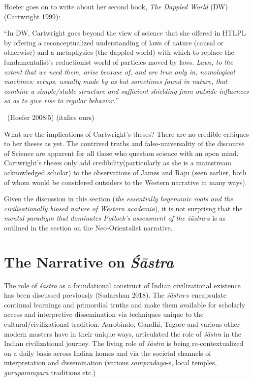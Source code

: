 \vskip 2pt

Hoefer goes on to write about her second book, \textit{The Dappled World} (DW)(Cartwright 1999):

\vskip 2pt

\begin{myquote}
“In DW, Cartwright goes beyond the view of science that she offered in HTLPL by offering a reconceptualized understanding of laws of nature (causal or otherwise) and a metaphysics (the dappled world) with which to replace the fundamentalist’s reductionist world of particles moved by laws. \textit{Laws, to the extent that we need them, arise because of, and are true only in, nomological machines: setups, usually made by us but sometimes found in nature, that combine a simple/stable structure and sufficient shielding from outside influences so as to give rise to regular behavior.”} 

~\hfill (Hoefer 2008:5) (italics ours)
\end{myquote}

What are the implications of Cartwright’s theses? There are no credible critiques to her theses as yet. The contrived truths and false-universality of the discourse of Science are apparent for all those who question science with an open mind. Cartwright’s theses only add credibility(particularly as she is a mainstream acknowledged scholar) to the observations of James and Raju (seen earlier, both of whom would be considered outsiders to the Western narrative in many ways).

Given the discussion in this section (\textit{the essentially hegemonic roots and the civilisationally biased nature of Western academia}), it is not surprisng that the \textit{mental paradigm that dominates Pollock’s assessment of the śāstra}-s is as outlined in the section on the Neo-Orientalist narrative.


\section*{The Narrative on \textit{Śāstra}}

The role of \textit{śāstra} as a foundational construct of Indian civilizational existence has been discussed previously (Sudarshan 2018). The \textit{śāstra}-s encapsulate continual learnings and primordial truths and make them available for scholarly access and interpretive dissemination via techniques unique to the cultural/civilizational tradition. Aurobindo, Gandhi, Tagore and various other modern masters have in their unique ways, articulated the role of \textit{śāstra} in the Indian civilizational journey. The living role of \textit{śāstra} is being re-contextualized on a daily basis across Indian homes and via the societal channels of interpretation and dissemination (various \textit{sampradāya}-s, local temples, \textit{guruparamparā} traditions etc.)

